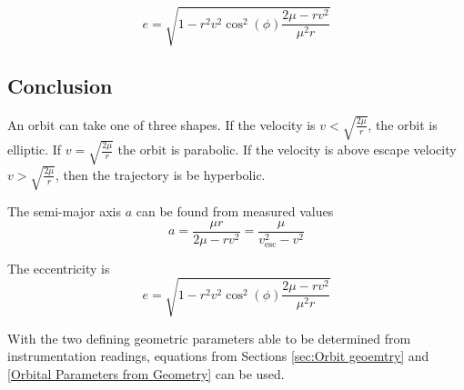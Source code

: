 \documentclass{article}
\begin{document}
\begin{equation}
    e=\sqrt{1-r^2v^2\cos^2(\phi)\frac{2\mu-rv^2}{\mu^2r}}
\end{equation}

\bigskip\bigskip
\subsection{Conclusion}

\bigskip
An orbit can take one of three shapes. If the velocity is $v<\sqrt{\frac{2\mu}{r}}$, the orbit is elliptic. If $v=\sqrt{\frac{2\mu}{r}}$ the orbit is parabolic. If the velocity is above escape velocity $v>\sqrt{\frac{2\mu}{r}}$, then the trajectory is be hyperbolic.

\bigskip
The semi-major axis $a$ can be found from measured values
$$a=\frac{\mu r}{2\mu-rv^2}=\frac{\mu}{v_\text{esc}^2-v^2}$$

\bigskip
The eccentricity is
$$e=\sqrt{1-r^2v^2\cos^2(\phi)\frac{2\mu-rv^2}{\mu^2r}}$$

With the two defining geometric parameters able to be determined from instrumentation readings, equations from Sections \ref{sec:Orbit geoemtry} and \ref{Orbital Parameters from Geometry} can be used.
\end{document}
